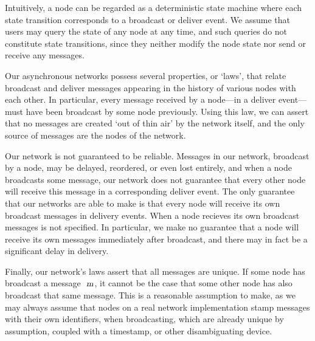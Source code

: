 \documentclass[acmlarge,review,anonymous]{acmart}\settopmatter{printfolios=true}
\begin{document}
Intuitively, a node can be regarded as a deterministic state machine where each state transition corresponds to a broadcast or deliver event.
We assume that users may query the state of any node at any time, and such queries do not constitute state transitions, since they neither modify the node state nor send or receive any messages.

Our asynchronous networks possess several properties, or `laws', that relate broadcast and deliver messages appearing in the history of various nodes with each other.
In particular, every message received by a node---in a deliver event---must have been broadcast by some node previously.
Using this law, we can assert that no messages are created `out of thin air' by the network itself, and the only source of messages are the nodes of the network.

Our network is not guaranteed to be reliable.
Messages in our network, broadcast by a node, may be delayed, reordered, or even lost entirely, and when a node broadcasts some message, our network does not guarantee that every other node will receive this message in a corresponding deliver event.
The only guarantee that our networks are able to make is that every node will receive its own broadcast messages in delivery events.
When a node recieves its own broadcast messages is not specified.
In particular, we make no guarantee that a node will receive its own messages immediately after broadcast, and there may in fact be a significant delay in delivery.

Finally, our network's laws assert that all messages are unique.
If some node has broadcast a message $\isa{m}$, it cannot be the case that some other node has also broadcast that same message.
This is a reasonable assumption to make, as we may always assume that nodes on a real network implementation stamp messages with their own identifiers, when broadcasting, which are already unique by assumption, coupled with a timestamp, or other disambiguating device.
\end{document}
